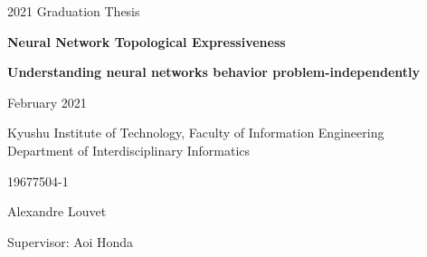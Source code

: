 \documentclass[12pt, a4paper]{article}
\begin{document}
   \vspace{20mm}
   \begin{center}
   {\LARGE 2021 Graduation Thesis}
   \end{center}

   \vspace{20mm}
   {\begin{center} \LARGE \textbf{Neural Network Topological Expressiveness} \end{center}}
   {\begin{center} \Large \textbf{Understanding neural networks behavior problem-independently} \end{center}}
   \vspace{40mm}
   \begin{center}
   {\Large February 2021}
   \end{center}
   \begin{center}
   {\Large Kyushu Institute of Technology, Faculty of Information Engineering
   \\ \vspace{3mm}
   Department of Interdisciplinary Informatics}
   \end{center}
   \vspace{3mm}
   \begin{center}
   {\Large 19677504-1}
   \end{center}
   \begin{center}
   {\Large Alexandre Louvet}
   \end{center}
  \vspace{20mm}
  \begin{center}
  {\Large Supervisor: Aoi Honda}
  \end{center}



\newpage
\thispagestyle{empty}
\mbox{}
\newpage

\pagestyle{fancy}
\fancyhead[R]{\thepage}
\cfoot{}

\setcounter{page}{0}
\setcounter{page}{1}

\tableofcontents

\newpage
\thispagestyle{empty}
\mbox{}
\newpage

\listoffigures

\newpage
\thispagestyle{empty}
\mbox{}
\newpage

\listoftables

\newpage

\thispagestyle{empty}
\mbox{}
\newpage

\setcounter{page}{0}
\setcounter{page}{1}
\end{document}
